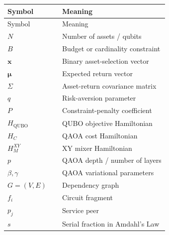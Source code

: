 \documentclass[11pt]{article}
\begin{document}
\begin{longtable}{@{}lp{0.66\linewidth}@{}}
\toprule
Symbol & Meaning \\
\midrule
\endfirsthead
\toprule
Symbol & Meaning \\
\midrule
\endhead
\(N\) & Number of assets / qubits \\
\(B\) & Budget or cardinality constraint \\
\(\mathbf{x}\) & Binary asset-selection vector \\
\(\boldsymbol{\mu}\) & Expected return vector \\
\(\Sigma\) & Asset-return covariance matrix \\
\(q\) & Risk-aversion parameter \\
\(P\) & Constraint-penalty coefficient \\
\(H_{\mathrm{QUBO}}\) & QUBO objective Hamiltonian \\
\(H_C\) & QAOA cost Hamiltonian \\
\(H_M^{XY}\) & XY mixer Hamiltonian \\
\(p\) & QAOA depth / number of layers \\
\(\beta,\gamma\) & QAOA variational parameters \\
\(G=(V,E)\) & Dependency graph \\
\(f_i\) & Circuit fragment \\
\(p_j\) & Service peer \\
\(s\) & Serial fraction in Amdahl's Law \\
\bottomrule
\end{longtable}
\end{document}
